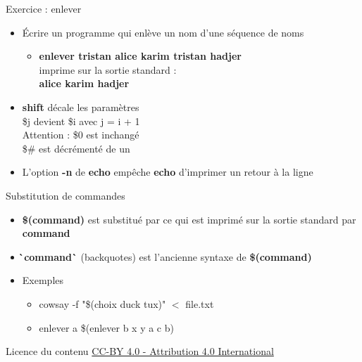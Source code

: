 \documentclass[xcolor=table]{beamer}
\begin{document}
\begin{frame}{Exercice : enlever}
\begin{itemize}
    \item Écrire un programme qui enlève un nom d'une séquence de noms
    \begin{itemize}
        \item \textbf{enlever tristan alice karim tristan hadjer}\\
        imprime sur la sortie standard :\\
        \textbf{alice karim hadjer}
    \end{itemize}
    \item \textbf{shift} décale les paramètres\\
    \$j devient \$i avec j = i + 1\\
    Attention : \$0 est inchangé\\
    \$\# est décrémenté de un
    \item L'option \textbf{-n} de \textbf{echo} empêche \textbf{echo} d'imprimer un retour à la ligne
\end{itemize}
\end{frame}

\begin{frame}{Substitution de commandes}
\begin{itemize}
    \item \textbf{\$(command)} est substitué par ce qui est imprimé sur la sortie standard par \textbf{command}
    \item \textbf{\`\,command\`} (backquotes) est l'ancienne syntaxe de \textbf{\$(command)}
    \item Exemples
    \begin{itemize}
        \item cowsay -f "\$(choix duck tux)" $<$ file.txt
        \item enlever a \$(enlever b x y a c b)
    \end{itemize}
\end{itemize}
\end{frame}

\begin{frame}{Licence du contenu}
\href{https://creativecommons.org/licenses/by/4.0/}{CC-BY 4.0 - Attribution 4.0 International}
\end{frame}
\end{document}
